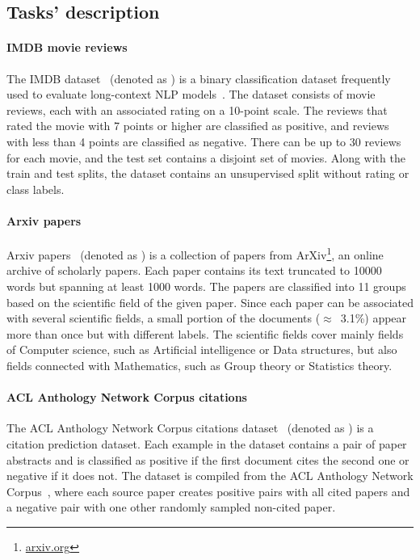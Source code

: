 \subsection{Tasks' description}

\paragraph{IMDB movie reviews} The IMDB dataset~\citep{maas2011learning}
(denoted as ) is a binary classification dataset frequently used to evaluate long-context NLP
models~\citep{zaheer2020big, beltagy2020longformer, le2014distributed}. The
dataset consists of movie reviews, each with an associated rating on a 10-point
scale. The reviews that rated the movie with 7 points or higher are classified
as positive, and reviews with less than 4 points are classified as negative.
There can be up to 30 reviews for each movie, and the test set contains a disjoint
set of movies. Along with the train and test splits, the dataset contains
an unsupervised split without rating or class labels.

\paragraph{Arxiv papers} Arxiv papers~\citep{arxiv_papers} (denoted as
) is a collection of papers from ArXiv\footnote{\url{arxiv.org}},
an online archive of scholarly papers. Each paper contains its text
truncated to 10000 words but spanning at least 1000 words. The papers are classified
into 11 groups based on the scientific field of the given paper. Since each paper
can be associated with several scientific fields, a small portion of the
documents ($\approx$~3.1\%) appear more than once but with different labels. The scientific fields cover mainly fields of Computer science, such
as Artificial intelligence or Data structures, but also fields connected with
Mathematics, such as Group theory or Statistics theory.

\paragraph{ACL Anthology Network Corpus citations} The ACL Anthology Network
Corpus citations dataset~\citep{zhou2020multilevel} (denoted as ) is
a citation prediction dataset. Each example in the dataset contains a pair of
paper abstracts and is classified as positive if the first document cites the
second one or negative if it does not. The dataset is compiled from the ACL
Anthology Network Corpus~\citep{radev2013acl}, where each source paper creates
positive pairs with all cited papers and a negative pair with one other randomly
sampled non-cited paper.

